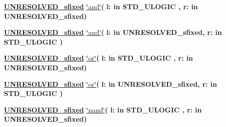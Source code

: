 \begin{DoxyCompactItemize}
\item 
{\bfseries {\bfseries {\bfseries \hyperlink{classfixed__pkg_aa723b28a027c3c0f9bca02d75e8df4d6}{U\+N\+R\+E\+S\+O\+L\+V\+E\+D\+\_\+sfixed}} \textcolor{vhdlchar}{ }}} \hyperlink{classfixed__pkg_a9d360eae7a29b645b4d8c6136e5404d0}{\char`\"{}and\char`\"{}}{\bfseries  ( }{\bfseries \textcolor{vhdlchar}{l\+: }\textcolor{stringliteral}{in }{\bfseries \textcolor{comment}{S\+T\+D\+\_\+\+U\+L\+O\+G\+I\+C}\textcolor{vhdlchar}{ }}}{\bfseries  , \textcolor{vhdlchar}{r\+: }\textcolor{stringliteral}{in }\textcolor{vhdlchar}{U\+N\+R\+E\+S\+O\+L\+V\+E\+D\+\_\+sfixed}}{\bfseries  )} 
\item 
{\bfseries {\bfseries {\bfseries \hyperlink{classfixed__pkg_aa723b28a027c3c0f9bca02d75e8df4d6}{U\+N\+R\+E\+S\+O\+L\+V\+E\+D\+\_\+sfixed}} \textcolor{vhdlchar}{ }}} \hyperlink{classfixed__pkg_a9d360eae7a29b645b4d8c6136e5404d0}{\char`\"{}and\char`\"{}}{\bfseries  ( }{\bfseries \textcolor{vhdlchar}{l\+: }\textcolor{stringliteral}{in }\textcolor{vhdlchar}{U\+N\+R\+E\+S\+O\+L\+V\+E\+D\+\_\+sfixed}}{\bfseries  , \textcolor{vhdlchar}{r\+: }\textcolor{stringliteral}{in }{\bfseries \textcolor{comment}{S\+T\+D\+\_\+\+U\+L\+O\+G\+I\+C}\textcolor{vhdlchar}{ }}}{\bfseries  )} 
\item 
{\bfseries {\bfseries {\bfseries \hyperlink{classfixed__pkg_aa723b28a027c3c0f9bca02d75e8df4d6}{U\+N\+R\+E\+S\+O\+L\+V\+E\+D\+\_\+sfixed}} \textcolor{vhdlchar}{ }}} \hyperlink{classfixed__pkg_abb4009af89da652667acf86784e2077a}{\char`\"{}or\char`\"{}}{\bfseries  ( }{\bfseries \textcolor{vhdlchar}{l\+: }\textcolor{stringliteral}{in }{\bfseries \textcolor{comment}{S\+T\+D\+\_\+\+U\+L\+O\+G\+I\+C}\textcolor{vhdlchar}{ }}}{\bfseries  , \textcolor{vhdlchar}{r\+: }\textcolor{stringliteral}{in }\textcolor{vhdlchar}{U\+N\+R\+E\+S\+O\+L\+V\+E\+D\+\_\+sfixed}}{\bfseries  )} 
\item 
{\bfseries {\bfseries {\bfseries \hyperlink{classfixed__pkg_aa723b28a027c3c0f9bca02d75e8df4d6}{U\+N\+R\+E\+S\+O\+L\+V\+E\+D\+\_\+sfixed}} \textcolor{vhdlchar}{ }}} \hyperlink{classfixed__pkg_abb4009af89da652667acf86784e2077a}{\char`\"{}or\char`\"{}}{\bfseries  ( }{\bfseries \textcolor{vhdlchar}{l\+: }\textcolor{stringliteral}{in }\textcolor{vhdlchar}{U\+N\+R\+E\+S\+O\+L\+V\+E\+D\+\_\+sfixed}}{\bfseries  , \textcolor{vhdlchar}{r\+: }\textcolor{stringliteral}{in }{\bfseries \textcolor{comment}{S\+T\+D\+\_\+\+U\+L\+O\+G\+I\+C}\textcolor{vhdlchar}{ }}}{\bfseries  )} 
\item 
{\bfseries {\bfseries {\bfseries \hyperlink{classfixed__pkg_aa723b28a027c3c0f9bca02d75e8df4d6}{U\+N\+R\+E\+S\+O\+L\+V\+E\+D\+\_\+sfixed}} \textcolor{vhdlchar}{ }}} \hyperlink{classfixed__pkg_a5aa453a7f3f95d682e4c6dad6aa12cd0}{\char`\"{}nand\char`\"{}}{\bfseries  ( }{\bfseries \textcolor{vhdlchar}{l\+: }\textcolor{stringliteral}{in }{\bfseries \textcolor{comment}{S\+T\+D\+\_\+\+U\+L\+O\+G\+I\+C}\textcolor{vhdlchar}{ }}}{\bfseries  , \textcolor{vhdlchar}{r\+: }\textcolor{stringliteral}{in }\textcolor{vhdlchar}{U\+N\+R\+E\+S\+O\+L\+V\+E\+D\+\_\+sfixed}}{\bfseries  )} 

\end{DoxyCompactItemize}
